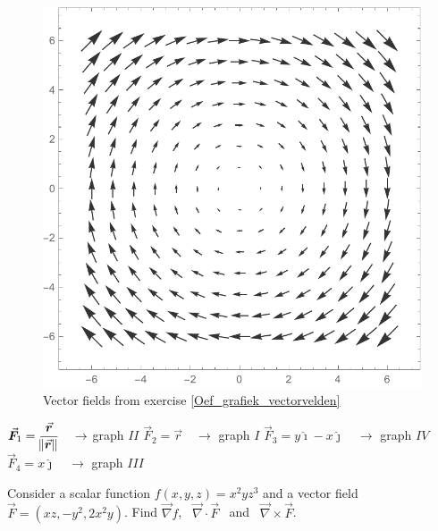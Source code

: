 \begin{Exercise}[difficulty = 2, label = Oef_grafiek_vectorvelden]
\begin{figure}[H]
\includegraphics[scale=0.4]{fig_double_32d}
\caption{Vector fields from exercise \ref{Oef_grafiek_vectorvelden} }
\label{fig_double_32}
\end{figure}

\end{Exercise}

\begin{Answer}
    \begin{multicols}{2}
    
        \Question $\vec F_1 = \dfrac{\vec r}{\norm{\vec r}} \quad \rightarrow$ graph $II$
        \Question $\vec F_2 = \vec r  \quad  \rightarrow$ graph $I$
        \Question $\vec F_3 = y \hat{\imath} - x \hat{\jmath}  \quad  \rightarrow$ graph $IV$
        \Question $\vec F_4 = x \hat{\jmath}  \quad  \rightarrow$ graph $III$
    \EndCurrentQuestion
    \end{multicols}
\end{Answer}

\begin{Exercise}[difficulty = 1] Consider a scalar function $f(x,y,z)=x^2yz^3$ and a vector field $\vec F = (xz, -y^2, 2x^2y)$. Find $\vec{\nabla} f$, \, $\vec{\nabla}  \cdot \vec F$ \, and \, $\vec{\nabla} \times \vec F $.
\end{Exercise}

